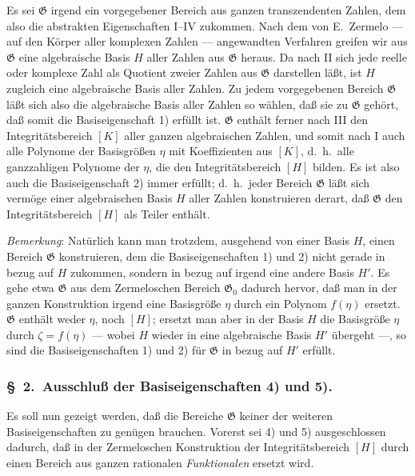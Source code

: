 \documentclass[12pt,a4paper]{article}
\begin{document}
Es sei $\mathfrak{G}$ irgend ein vorgegebener Bereich aus ganzen transzendenten Zahlen, dem also die abstrakten Eigenschaften I--IV zukommen. Nach dem von E.~Zermelo --- auf den K\"orper aller komplexen Zahlen --- angewandten Verfahren greifen wir aus $\mathfrak{G}$ eine algebraische Basis $H$ aller Zahlen aus $\mathfrak{G}$ heraus. Da nach II sich jede reelle oder komplexe Zahl als Quotient zweier Zahlen aus $\mathfrak{G}$ darstellen l\"a\ss t, ist $H$ zugleich eine algebraische Basis aller Zahlen. Zu jedem vorgegebenen Bereich $\mathfrak{G}$ l\"a\ss t sich also die algebraische Basis aller Zahlen so w\"ahlen, da\ss{} sie zu $\mathfrak{G}$ geh\"ort, da\ss{} somit die Basiseigenschaft 1) erf\"ullt ist. $\mathfrak{G}$ enth\"alt ferner nach III den Integrit\"atsbereich $[K]$ aller ganzen algebraischen Zahlen, und somit nach I auch alle Polynome der Basisgr\"o\ss en $\eta$ mit Koeffizienten aus $[K]$, d.\ h.\ alle ganzzahligen Polynome der $\eta$, die den Integrit\"atsbereich $[H]$ bilden. Es ist also auch die Basiseigenschaft 2) immer erf\"ullt; d.\ h.\ jeder Bereich $\mathfrak{G}$ l\"a\ss t sich verm\"oge einer algebraischen Basis $H$ aller Zahlen konstruieren derart, da\ss{} $\mathfrak{G}$ den Integrit\"atsbereich $[H]$ als Teiler enth\"alt.

\emph{Bemerkung}: Nat\"urlich kann man trotzdem, ausgehend von einer Basis $H$, einen Bereich $\mathfrak{G}$ konstruieren, dem die Basiseigenschaften 1) und 2) nicht gerade in bezug auf $H$ zukommen, sondern in bezug auf irgend eine andere Basis $H'$. Es gehe etwa $\mathfrak{G}$ aus dem Zermeloschen Bereich $\mathfrak{G}_0$ dadurch hervor, da\ss{} man in der ganzen Konstruktion irgend eine Basisgr\"o\ss e $\eta$ durch ein Polynom $f(\eta)$ ersetzt. $\mathfrak{G}$ enth\"alt weder $\eta$, noch $[H]$; ersetzt man aber in der Basis $H$ die Basisgr\"o\ss e $\eta$ durch $\zeta = f(\eta)$ --- wobei $H$ wieder in eine algebraische Basis $H'$ \"ubergeht ---, so sind die Basiseigenschaften 1) und 2) f\"ur $\mathfrak{G}$ in bezug auf $H'$ erf\"ullt.

\subsubsection*{\S\ 2.\ Ausschlu\ss{} der Basiseigenschaften 4) und 5).}

Es soll nun gezeigt werden, da\ss{} die Bereiche $\mathfrak{G}$ keiner der weiteren Basiseigenschaften zu gen\"ugen brauchen. Vorerst sei 4) und 5) ausgeschlossen dadurch, da\ss{} in der Zermeloschen Konstruktion der Integrit\"atsbereich $[H]$ durch einen Bereich aus ganzen rationalen \emph{Funktionalen} ersetzt wird.
\end{document}
